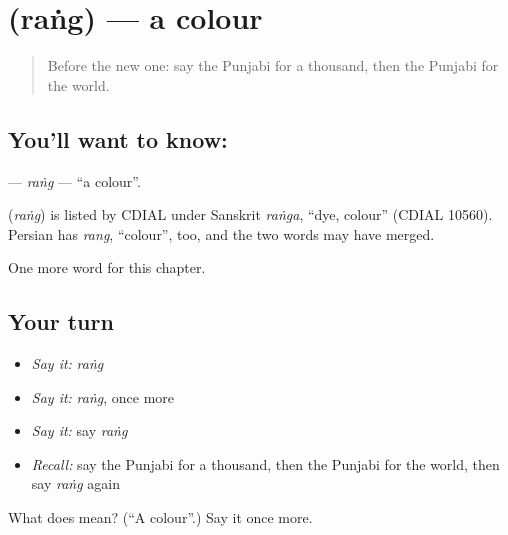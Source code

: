 \section[\texorpdfstring{\pa{ਰੰਗ} (raṅg)}{ਰੰਗ (raṅg)}]{ (raṅg) — a colour}

\label{lesson:PA-C97-rang}



\begin{quote}
Before the new one: say the Punjabi for a thousand, then the Punjabi for the world.
\end{quote}

\subsection*{You'll want to know: }
\textbf{} — \emph{raṅg} — \textquotedblleft{}a colour\textquotedblright{}.

\begin{cousinweb}
\textbf{} (\emph{raṅg}) is listed by CDIAL under Sanskrit \emph{raṅga}, \textquotedblleft{}dye, colour\textquotedblright{} (CDIAL 10560). Persian has \emph{rang}, \textquotedblleft{}colour\textquotedblright{}, too, and the two words may have merged.
\end{cousinweb}

\begin{grammarlens}[title={What you've built}]
One more word for this chapter.
\end{grammarlens}

\subsection*{Your turn}
\begin{itemize}
\raggedright
  \item \emph{Say it:} \emph{raṅg}
  \item \emph{Say it:} \emph{raṅg}, once more
  \item \emph{Say it:} say \emph{raṅg}
  \item \emph{Recall:} say the Punjabi for a thousand, then the Punjabi for the world, then say \emph{raṅg} again
\end{itemize}

\begin{tcolorbox}[breakable,colback=teal!4,colframe=teal!35!black,title={Before you move on}]
What does  mean? (\textquotedblleft{}A colour\textquotedblright{}.) Say it once more.
\end{tcolorbox}
